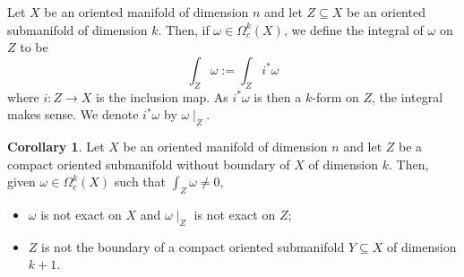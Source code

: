 \documentclass[]{article}
\theoremstyle{definition}
\newtheorem{corollary}{Corollary}[theorem]
\theoremstyle{definition}
\begin{document}
Let \(X\) be an oriented manifold of dimension \(n\) and let \(Z \subseteq X\) 
be an oriented submanifold of dimension \(k\). Then, if 
\(\omega \in \Omega^k_c(X)\), we define the integral of \(\omega\) on \(Z\) to be 
\[\int_Z \omega := \int_Z i^* \omega\]
where \(i : Z \to X\) is the inclusion map. As \(i^* \omega\) is then a 
\(k\)-form on \(Z\), the integral makes sense. We denote \(i^* \omega\) by 
\(\omega\mid_Z\).

\begin{corollary}
  Let \(X\) be an oriented manifold of dimension \(n\) and let \(Z\) be a 
  compact oriented submanifold without boundary of \(X\) of dimension \(k\). 
  Then, given \(\omega \in \Omega_c^k(X)\) such that \(\int_Z \omega \neq 0\), 
  \begin{itemize}
    \item \(\omega\) is not exact on \(X\) and \(\omega\mid_Z\) is not exact on \(Z\);
    \item \(Z\) is not the boundary of a compact oriented submanifold \(Y \subseteq X\) 
     of dimension \(k + 1\).
  \end{itemize}
\end{corollary}
\end{document}
